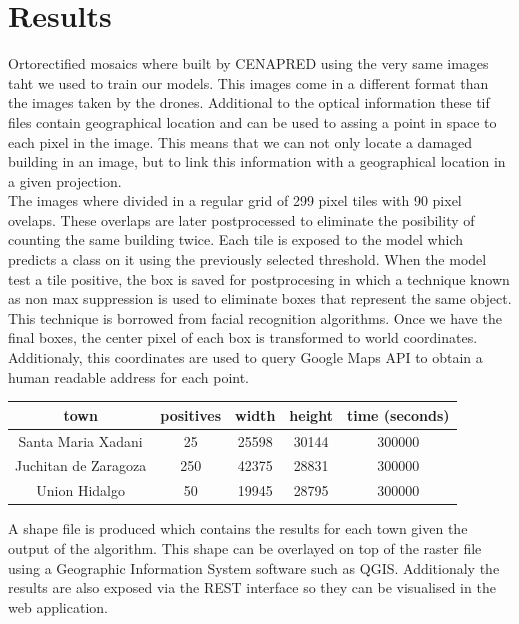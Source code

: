 \section{Results}

Ortorectified mosaics where built by CENAPRED using the very same images taht we used to train our models. This images come in a different format than the images taken by the drones. Additional to the optical information these tif files contain geographical location and can be used to assing a point in space to each pixel in the image. This means that we can not only locate a damaged building in an image, but to link this information with a geographical location in a given projection.\\

The images where divided in a regular grid of 299 pixel tiles with 90 pixel ovelaps. These overlaps are later postprocessed to eliminate the posibility of counting the same building twice. Each tile is exposed to the model which predicts a class on it using the previously selected threshold. When the model test a tile positive, the box is saved for postprocesing in which a technique known as non max suppression is used to eliminate boxes that represent the same object. This technique is borrowed from facial recognition algorithms. Once we have the final boxes, the center pixel of each box is transformed to world coordinates. Additionaly, this coordinates are used to query Google Maps API to obtain a human readable address for each point.


\begin{center}
  \begin{tabular}{|c|c|c|c|c|}
    \hline
    town & positives & width & height & time (seconds) \\ \hline
    Santa Maria Xadani &25 & 25598 & 30144 & 300000 \\ \hline
    Juchitan de Zaragoza &250 & 42375 & 28831 & 300000 \\ \hline
    Union Hidalgo &50 & 19945 & 28795 & 300000 \\
    \hline
  \end{tabular}
\end{center}

A shape file is produced which contains the results for each town given the output of the algorithm. This shape can be overlayed on top of the raster file using a Geographic Information System software such as QGIS. Additionaly the results are also exposed via the REST interface so they can be visualised in the web application.



